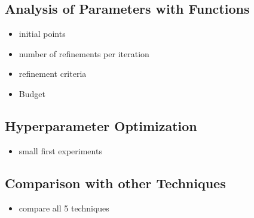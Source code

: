 \subsection{Analysis of Parameters with Functions}

\begin{itemize}
	\item initial points
	\item number of refinements per iteration
	\item refinement criteria
	\item Budget
\end{itemize}

\subsection{Hyperparameter Optimization}

\begin{itemize}
	\item small first experiments
\end{itemize}

\subsection{Comparison with other Techniques}

\begin{itemize}
	\item compare all 5 techniques
\end{itemize}








